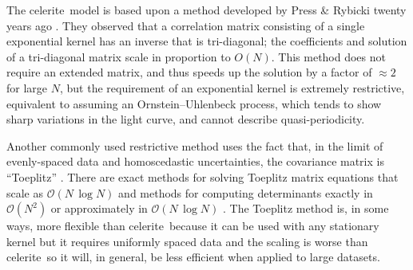 \documentclass[manuscript, letterpaper]{aastex6}
\newcommand{\project}[1]{\textsf{#1}}
\newcommand{\celerite}{\project{celerite}}
\begin{document}
The \celerite\ model is based upon a method developed by Press \& Rybicki twenty
years ago \citep{Rybicki:1995}.  They observed that a correlation matrix consisting
of a single exponential kernel has an inverse that is tri-diagonal;
the coefficients and solution of a tri-diagonal matrix scale in proportion to $O(N)$.
This method does not require an extended matrix, and thus speeds up the solution
by a factor of $\approx 2$ for large $N$, but
the requirement of an exponential kernel is extremely restrictive,
equivalent to assuming an Ornstein--Uhlenbeck process, which tends to show sharp
variations in the light curve, and cannot describe quasi-periodicity.

Another commonly used restrictive method uses the fact that, in the limit of
evenly-spaced data and homoscedastic uncertainties, the covariance matrix is
``Toeplitz'' \citep[for example][]{Dillon:2013}.
There are exact methods for solving Toeplitz matrix equations that scale as
$\mathcal{O}(N\,\log N)$ and methods for computing determinants exactly in
$\mathcal{O}(N^2)$ or approximately in $\mathcal{O}(N\,\log N)$
\citep{Wilson:2014}.
The Toeplitz method is, in some ways, more flexible than \celerite\ because it
can be used with any stationary kernel but it requires uniformly spaced data
and the scaling is worse than \celerite\ so it will, in general, be less
efficient when applied to large datasets.
\end{document}
